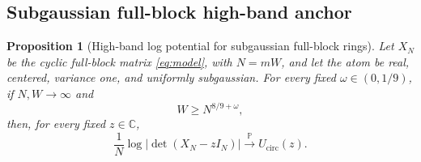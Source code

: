 \documentclass[11pt,reqno]{amsart}
\numberwithin{equation}{section}
\newtheorem{proposition}[theorem]{Proposition}
\theoremstyle{definition}
\theoremstyle{remark}
\newcommand{\C}{\mathbb C}
\newcommand{\Pp}{\mathbb P}
\newcommand{\1}{\mathbf 1}
\newcommand{\cir}{\mathrm{circ}}
\begin{document}
\subsection{Subgaussian full-block high-band anchor}

\begin{proposition}[High-band log potential for subgaussian full-block rings]
\label{prop:subgaussian-block-high-band}
Let $X_N$ be the cyclic full-block matrix \eqref{eq:model}, with $N=mW$,
and let the atom be real, centered, variance one, and uniformly subgaussian.
For every fixed $\omega\in(0,1/9)$, if $N,W\to\infty$ and
\begin{equation}
 W\ge N^{8/9+\omega},
 \label{eq:subgaussian-block-high-band}
\end{equation}
then, for every fixed $z\in\C$,
\begin{equation}
 \frac1N\log|\det(X_N-zI_N)|
 \xrightarrow{\Pp}U_{\cir}(z).
 \label{eq:gb-high-band-logdet}
\end{equation}
\end{proposition}
\end{document}
